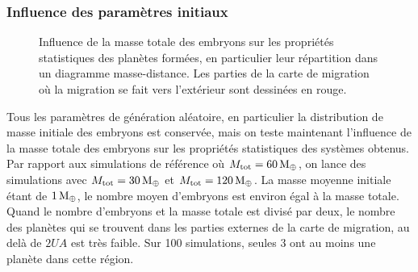 \subsubsection{Influence des paramètres initiaux}
\begin{figure}[htbp]
\centering
{}\hfill
{}

\caption{Influence de la masse totale des embryons sur les propriétés statistiques des planètes formées, en particulier leur répartition dans un diagramme masse-distance. Les parties de la carte de migration où la migration se fait vers l'extérieur sont dessinées en rouge.}\label{fig:HSE_m_tot_influence}
\end{figure}

Tous les paramètres de génération aléatoire, en particulier la distribution de masse initiale des embryons est conservée, mais
on teste maintenant l'influence de la masse totale des embryons sur les propriétés statistiques des systèmes obtenus. Par
rapport aux simulations de référence où $M_\text{tot}=60\mathrm{\thinspace M_\oplus}$, on lance des simulations avec
$M_\text{tot}=30\mathrm{\thinspace M_\oplus}$ et $M_\text{tot}=120\mathrm{\thinspace M_\oplus}$. La masse moyenne initiale étant
de $1\mathrm{\thinspace M_\oplus}$, le nombre moyen d'embryons est environ égal à la masse totale. Quand le nombre d'embryons et la masse totale est
divisé par deux, le nombre des planètes qui se trouvent dans les parties externes de la carte de migration, au delà de
$2\unit{UA}$ est très faible. Sur 100 simulations, seules 3 ont au moins une planète dans cette région. 

